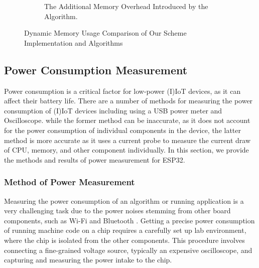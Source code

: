 \begin{figure}[H]
\begin{subfigure}[c]{0.48\linewidth}
{
            }
    \caption{The Additional Memory Overhead Introduced by the Algorithm.}
    \label{Fig:memory-algo}
\end{subfigure}
\caption{Dynamic Memory Usage Comparison of Our Scheme Implementation and Algorithms}
\label{Fig:memory-impl-algo}
\end{figure}

\subsection{Power Consumption Measurement }
\label{sec:power}
Power consumption is a critical factor for low-power (I)IoT devices, as it can affect their battery life. There are a number of methods for measuring the power consumption of (I)IoT devices including using a USB power meter and Oscilloscope. while the former method can be inaccurate, as it does not account for the power consumption of individual components in the device, the latter method is more accurate as it uses a current probe to measure the current draw of CPU, memory, and other component individually. In this section, we provide the methods and results of power measurement for ESP32. 

\subsubsection*{Method of Power Measurement}
Measuring the power consumption of an algorithm or running application is a very challenging task due to the power noises stemming from other board components, such as Wi-Fi and Bluetooth \cite{noauthor_current_nodate}. Getting a precise power consumption of running machine code on a chip requires a carefully set up lab environment, where the chip is isolated from the other components. This procedure involves connecting a fine-grained voltage source, typically an expensive oscilloscope, and capturing and measuring the power intake to the chip.

